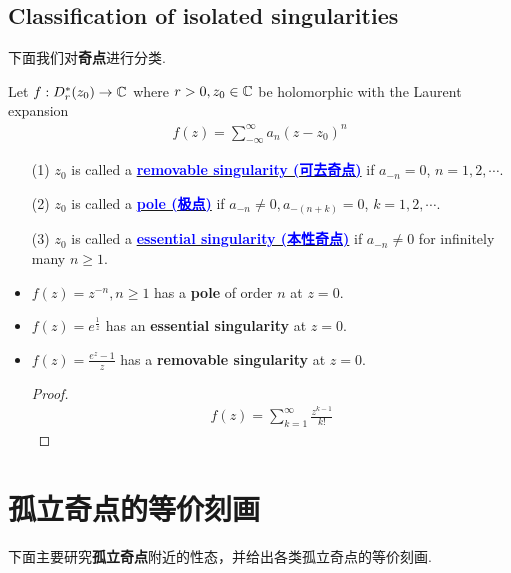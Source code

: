 \subsection{\textbf{Classification of isolated singularities}}
	下面我们对\textbf{奇点}进行分类.
	\begin{defn}\label{def 8.2.2}
		Let $f : D_{r}^{*}(z_0) \rightarrow \mathbb{C}$ where $r > 0 , z_0 \in \mathbb{C}$ be holomorphic with the Laurent expansion
		\begin{align}
			f(z) = \sum_{-\infty}^{\infty}{a_n (z - z_0)^n}
		\end{align}
		\begin{enumerate}
			\item[(1)]$z_0$ is called a \underline{\textcolor{blue}{\textbf{removable singularity (可去奇点)}}} if $a_{-n} = 0$, $n = 1 , 2 , \cdots$.
			
			\item[(2)]$z_0$ is called a \underline{\textcolor{blue}{\textbf{pole (极点)}}} if $a_{-n} \neq 0 , a_{-(n + k)} = 0$, $k = 1 , 2 , \cdots$.
			
			\item[(3)]$z_0$ is called a \underline{\textcolor{blue}{\textbf{essential singularity (本性奇点)}}} if $a_{-n} \neq 0$ for infinitely many $n \geq 1$.
		\end{enumerate}
	
		\vspace{2em}
		\begin{example}\label{ex 8.2.2}
			\begin{itemize}
				\item $f(z) = z^{-n} , n \geq 1$ has a \textbf{pole} of order $n$ at $z = 0$.
				
				\item $f(z) = e^{\frac{1}{z}}$ has an \textbf{essential singularity} at $z = 0$.
				
				\item $f(z) = \frac{e^z - 1}{z}$ has a \textbf{removable singularity} at $z = 0$.
				\begin{proof}
					\begin{align}
						f(z) = \sum_{k = 1}^{\infty}{\frac{z^{k - 1}}{k!}}
					\end{align}
				\end{proof}
			\end{itemize}
		\end{example}
	\end{defn}

\newpage
\section{孤立奇点的等价刻画}
	\begin{center}
		下面主要研究\textbf{孤立奇点}附近的性态，并给出各类孤立奇点的等价刻画.
	\end{center}

